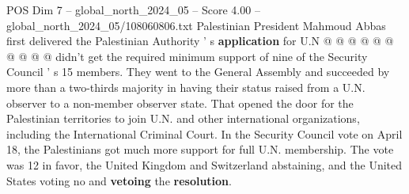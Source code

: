 \begin{textsample}{POS Dim 7 – global\_north\_2024\_05 – Score 4.00 – global\_north\_2024\_05/108060806.txt}
Palestinian President Mahmoud Abbas first delivered the Palestinian Authority ' s \textbf{application} for U.N @ @ @ @ @ @ @ @ @ @ didn't get the required minimum support of nine of the Security Council ' s 15 members.
They went to the General Assembly and succeeded by more than a two-thirds majority in having their status raised from a U.N. observer to a non-member observer state.
That opened the door for the Palestinian territories to join U.N. and other international organizations, including the International Criminal Court.
In the Security Council vote on April 18, the Palestinians got much more support for full U.N. membership.
The vote was 12 in favor, the United Kingdom and Switzerland abstaining, and the United States voting no and \textbf{vetoing} the \textbf{resolution}.

\end{textsample}
